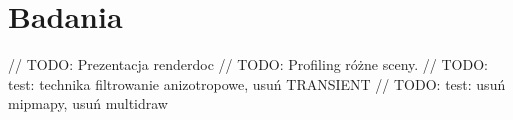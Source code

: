 \chapter{Badania}
\label{chap:research}

// TODO: Prezentacja renderdoc
// TODO: Profiling różne sceny.
// TODO: test: technika filtrowanie anizotropowe, usuń TRANSIENT
// TODO: test: usuń mipmapy, usuń multidraw

